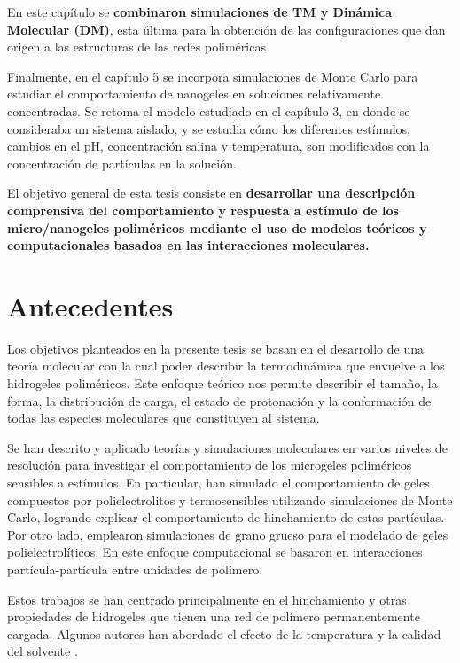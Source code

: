En este cap\'itulo se \textbf{combinaron simulaciones de TM y Din\'amica Molecular (DM)}, esta \'ultima para la obtenci\'on de las configuraciones que dan origen a las estructuras de las redes polim\'ericas.

Finalmente, en el cap\'itulo 5 se incorpora simulaciones de Monte Carlo para estudiar el comportamiento de nanogeles en soluciones relativamente concentradas. Se retoma el modelo estudiado en el cap\'itulo 3, en donde se consideraba un sistema aislado, y se estudia c\'omo los diferentes est\'imulos, cambios en el pH, concentraci\'on salina y temperatura, son modificados con la concentraci\'on de part\'iculas en la soluci\'on.

El objetivo general de esta tesis consiste en \textbf{desarrollar una descripci\'on comprensiva del comportamiento y respuesta a est\'imulo de los micro/nanogeles polim\'ericos mediante el uso de modelos te\'oricos y computacionales basados en las interacciones moleculares.}


\section{Antecedentes}

Los objetivos planteados en la presente tesis se basan en el desarrollo de una teor\'ia molecular con la cual poder describir la termodin\'amica que envuelve a los hidrogeles polim\'ericos.
Este enfoque te\'orico nos permite describir el tama\~no, la forma, la distribuci\'on de carga, el estado de protonaci\'on y la conformaci\'on de todas las especies moleculares que constituyen al sistema.

Se han descrito y aplicado teor\'ias y simulaciones moleculares en varios niveles de resoluci\'on para investigar el comportamiento de los microgeles polim\'ericos sensibles a est\'imulos.
En particular, \citet{quesada2011gel} han simulado el comportamiento de geles compuestos por polielectrolitos y termosensibles utilizando simulaciones de Monte Carlo, logrando explicar el comportamiento de hinchamiento de estas part\'iculas. Por otro lado, \citet{ahualli2016coarse} emplearon simulaciones de grano grueso para el modelado de geles polielectrol\'iticos. En este enfoque computacional se basaron en interacciones part\'icula-part\'icula entre unidades de pol\'imero.

Estos trabajos se han centrado principalmente en el hinchamiento y otras propiedades de hidrogeles que tienen una red de pol\'imero permanentemente cargada. Algunos autores han abordado el efecto de la temperatura y la calidad del solvente \cite{Jha2011, QuesadaPerez2013, moncho-jorda2016a, ahualli2016coarse, AdroherBenitez2017PCCP}.

